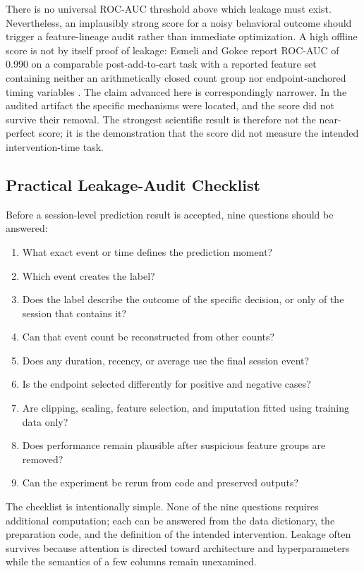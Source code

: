 \documentclass[conference, letterpaper]{IEEEtran}
\begin{document}
There is no universal ROC-AUC threshold above which leakage must exist. Nevertheless, an implausibly strong score for a noisy behavioral outcome should trigger a feature-lineage audit rather than immediate optimization. A high offline score is not by itself proof of leakage: Esmeli and Gokce report ROC-AUC of 0.990 on a comparable post-add-to-cart task with a reported feature set containing neither an arithmetically closed count group nor endpoint-anchored timing variables \cite{esmeli2025}. The claim advanced here is correspondingly narrower. In the audited artifact the specific mechanisms were located, and the score did not survive their removal. The strongest scientific result is therefore not the near-perfect score; it is the demonstration that the score did not measure the intended intervention-time task.

\subsection{Practical Leakage-Audit Checklist}
Before a session-level prediction result is accepted, nine questions should be answered:
\begin{enumerate}
    \item What exact event or time defines the prediction moment?
    \item Which event creates the label?
    \item Does the label describe the outcome of the specific decision, or only of the session that contains it?
    \item Can that event count be reconstructed from other counts?
    \item Does any duration, recency, or average use the final session event?
    \item Is the endpoint selected differently for positive and negative cases?
    \item Are clipping, scaling, feature selection, and imputation fitted using training data only?
    \item Does performance remain plausible after suspicious feature groups are removed?
    \item Can the experiment be rerun from code and preserved outputs?
\end{enumerate}
The checklist is intentionally simple. None of the nine questions requires additional computation; each can be answered from the data dictionary, the preparation code, and the definition of the intended intervention. Leakage often survives because attention is directed toward architecture and hyperparameters while the semantics of a few columns remain unexamined.
\end{document}
